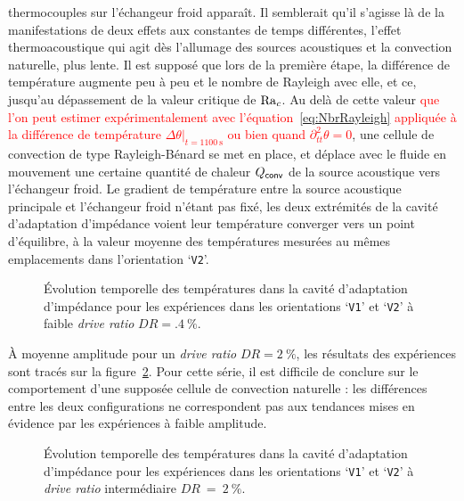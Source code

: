 thermocouples sur l'échangeur froid apparaît. Il semblerait qu'il s'agisse là de la manifestations de deux effets aux constantes de temps différentes, l'effet thermoacoustique qui agit dès l'allumage des sources acoustiques et la convection naturelle, plus lente. Il est supposé que lors de la première étape, la différence de température augmente peu à peu et le nombre de Rayleigh avec elle, et ce, jusqu'au dépassement de la valeur critique de $\mathrm{Ra}_c$. Au delà de cette valeur \textcolor{red}{que l'on peut estimer expérimentalement avec l'équation~\eqref{eq:NbrRayleigh} appliquée à la différence de température $\Delta \theta|_{t=\qty{1100}{\second}}$ ou bien quand $\partial^2_{tt}\theta=\num{0}$}, une cellule de convection de type Rayleigh-Bénard se met en place, et déplace avec le fluide en mouvement une certaine quantité de chaleur $Q_{\sf conv}$ de la source acoustique vers l'échangeur froid. Le gradient de température entre la source acoustique principale et l'échangeur froid n'étant pas fixé, les deux extrémités de la cavité d'adaptation d'impédance voient leur température converger vers un point d'équilibre, à la valeur moyenne des températures mesurées au mêmes emplacements dans l'orientation `\texttt{V2}'.
\smallskip
 
\begin{figure}[!ht]
    \centering
    
    \caption{\'Evolution temporelle des températures dans la cavité d'adaptation d'impédance pour les expériences dans les orientations `\texttt{V1}' et `\texttt{V2}' à faible \textit{drive ratio} $DR=\qty{.4}{\percent}$.}
    \label{fig:Acou_CHXout_V1V2_Low}
\end{figure}

À moyenne amplitude pour un \textit{drive ratio} $DR=\qty{2}{\percent}$, les résultats des expériences sont tracés sur la figure~\ref{fig:Acou_CHXout_V1V2_Mid}. Pour cette série, il est difficile de conclure sur le comportement d'une supposée cellule de convection naturelle : les différences entre les deux configurations ne correspondent pas aux tendances mises en évidence par les expériences à faible amplitude.
\smallskip

\begin{figure}[!ht]
    \centering
    
    \caption{\'Evolution temporelle des températures dans la cavité d'adaptation d'impédance pour les expériences dans les orientations `\texttt{V1}' et `\texttt{V2}' à \textit{drive ratio} intermédiaire $DR~=~\qty{2}{\percent}$.}
    \label{fig:Acou_CHXout_V1V2_Mid}
\end{figure}

